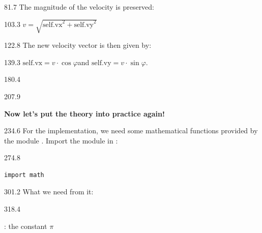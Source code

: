 \documentclass{aslab}
\begin{document}
\nextpage
\begin{region}{81.7}
The magnitude of the velocity is preserved:
\end{region}

\begin{region}{103.3}
\centering $v = \sqrt{\text{self.vx}^2 + \text{self.vy}^2}$
\end{region}

\begin{region}{122.8}
The new velocity vector is then given by:
\end{region}

\begin{region}{139.3}
\centering $\text{self.vx} = v\cdot\cos\varphi$\quad and\quad
  $\text{self.vy} = v\cdot\sin\varphi$.
\end{region}

\begin{region}{180.4}
\end{region}

\begin{region}{207.9}
\begin{ntasks}
\item \textbf{Now let's put the theory into practice again!}
\end{ntasks}
\end{region}

\begin{region}[x=74.7,right=0,pitch=13.5]{234.6}
For the implementation, we need some mathematical functions provided by the
module . Import the module in :
\end{region}

\begin{region}[x=74.7,right=0]{274.8}
\begin{lstlisting}[style=py]
import math
\end{lstlisting}
\end{region}

\begin{region}[x=74.7,right=0]{301.2}
What we need from it:
\end{region}

\begin{region}[x=74.7,right=0]{318.4}
\begin{dotlist}
\item {}: the constant $\pi$
\end{dotlist}
\end{region}
\end{document}
